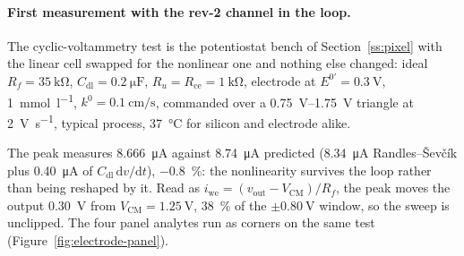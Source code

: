 
\paragraph{First measurement with the rev-2 channel in the loop.} The
cyclic-voltammetry test is the potentiostat bench of Section~\ref{ss:pixel} with
the linear cell swapped for the nonlinear one and nothing else changed: ideal
\(R_f = \SI{35}{\kilo\ohm}\), \(C_{\mathrm{dl}} = \SI{0.2}{\micro\farad}\),
\(R_u = R_{\mathrm{ce}} = \SI{1}{\kilo\ohm}\), electrode at
\(E^{0\prime} = \SI{0.3}{\volt}\), \SI{1}{\milli\mole\per\litre},
\(k^0 = \SI{0.1}{\centi\metre\per\second}\), commanded over a
\SIrange{0.75}{1.75}{\volt} triangle at \SI{2}{\volt\per\second}, typical
process, \SI{37}{\celsius} for silicon and electrode alike.

The peak measures \SI{8.666}{\micro\ampere} against \SI{8.74}{\micro\ampere}
predicted (\SI{8.34}{\micro\ampere} Randles--\v{S}ev\v{c}\'ik plus
\SI{0.40}{\micro\ampere} of \(C_{\mathrm{dl}}\,\mathrm{d}v/\mathrm{d}t\)),
\SI{-0.8}{\percent}: the nonlinearity survives the loop rather than being
reshaped by it. Read as \(i_{\mathrm{we}} = (v_{\mathrm{out}} -
V_{\mathrm{CM}})/R_f\), the peak moves the output \SI{0.30}{\volt} from
\(V_{\mathrm{CM}} = \SI{1.25}{\volt}\), \SI{38}{\percent} of the
\(\pm\SI{0.80}{\volt}\) window, so the sweep is unclipped. The four panel
analytes run as corners on the same test (Figure~\ref{fig:electrode-panel}).

